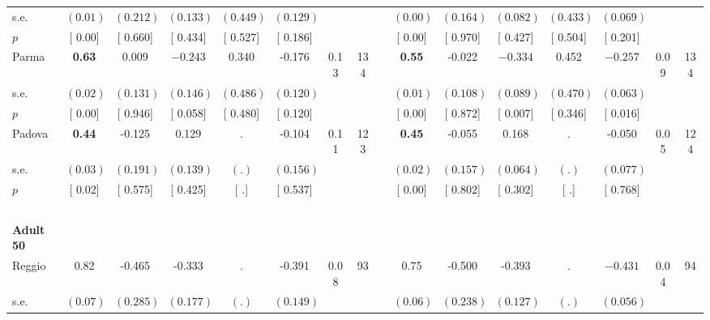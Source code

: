 \begin{longtable}{L{8em} c c c c c c c p{1em} c c c c c c c}
\quad \quad \quad \quad s.e.& $ (     0.01)$ & $ (    0.212)$ & $ (    0.133)$ & $ (    0.449)$ & $ (    0.129)$ & & & & $ (     0.00)$ & $ (    0.164)$ & $ (    0.082)$ & $ (    0.433)$ & $ (    0.069)$ & &  \\*
\quad \quad \quad \quad $ p$ & [     0.00] & [    0.660] & [    0.434] & [    0.527] & [    0.186] & & & & [     0.00] & [    0.970] & [    0.427] & [    0.504] & [    0.201] & &  \\[1em]
\quad \quad \quad Parma& \textbf{     0.63} &     0.009 & $ \mathbf{   -0.243}$ &     0.340 &    -0.176 &      0.13 &       134 & & \textbf{     0.55} &    -0.022 & $ \mathbf{   -0.334}$ &     0.452 & $ \mathbf{   -0.257}$ &      0.09 &       134  \\*
\quad \quad \quad \quad s.e.& $ (     0.02)$ & $ (    0.131)$ & $ (    0.146)$ & $ (    0.486)$ & $ (    0.120)$ & & & & $ (     0.01)$ & $ (    0.108)$ & $ (    0.089)$ & $ (    0.470)$ & $ (    0.063)$ & &  \\*
\quad \quad \quad \quad $ p$ & [     0.00] & [    0.946] & [    0.058] & [    0.480] & [    0.120] & & & & [     0.00] & [    0.872] & [    0.007] & [    0.346] & [    0.016] & &  \\[1em]
\quad \quad \quad Padova& \textbf{     0.44} &    -0.125 &     0.129 &         . &    -0.104 &      0.11 &       123 & & \textbf{     0.45} &    -0.055 &     0.168 &         . &    -0.050 &      0.05 &       124  \\*
\quad \quad \quad \quad s.e.& $ (     0.03)$ & $ (    0.191)$ & $ (    0.139)$ & $ (        .)$ & $ (    0.156)$ & & & & $ (     0.02)$ & $ (    0.157)$ & $ (    0.064)$ & $ (        .)$ & $ (    0.077)$ & &  \\*
\quad \quad \quad \quad $ p$ & [     0.02] & [    0.575] & [    0.425] & [        .] & [    0.537] & & & & [     0.00] & [    0.802] & [    0.302] & [        .] & [    0.768] & &  \\[1em]
~\\[1em]
\quad \quad \textbf{Adult 50} & & & & & & & & & & & & & & & \\* 
\quad \quad \quad Reggio& 0.82 &    -0.465 &    -0.333 &         . &    -0.391 &      0.08 &        93 & & 0.75 &    -0.500 &    -0.393 &         . & $ \mathbf{   -0.431}$ &      0.04 &        94  \\*
\quad \quad \quad \quad s.e.& $ (     0.07)$ & $ (    0.285)$ & $ (    0.177)$ & $ (        .)$ & $ (    0.149)$ & & & & $ (     0.06)$ & $ (    0.238)$ & $ (    0.127)$ & $ (        .)$ & $ (    0.056)$ & &  \\*

\end{longtable}
